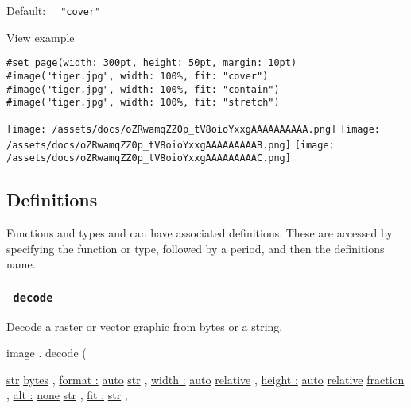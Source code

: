 Default: \texttt{\ }{\texttt{\ "cover"\ }}\texttt{\ }


View example

\begin{verbatim}
#set page(width: 300pt, height: 50pt, margin: 10pt)
#image("tiger.jpg", width: 100%, fit: "cover")
#image("tiger.jpg", width: 100%, fit: "contain")
#image("tiger.jpg", width: 100%, fit: "stretch")
\end{verbatim}

\texttt{[image: /assets/docs/oZRwamqZZ0p\_tV8oioYxxgAAAAAAAAAA.png]}
\texttt{[image: /assets/docs/oZRwamqZZ0p\_tV8oioYxxgAAAAAAAAAB.png]}
\texttt{[image: /assets/docs/oZRwamqZZ0p\_tV8oioYxxgAAAAAAAAAC.png]}

\subsection{\texorpdfstring{{ Definitions
}}{ Definitions }}\label{definitions}

\label{definitions-tooltip}
Functions and types and can have associated definitions. These are
accessed by specifying the function or type, followed by a period, and
then the definition\textquotesingle s name.

\subsubsection{\texorpdfstring{\texttt{\ decode\ }}{ decode }}\label{definitions-decode}

Decode a raster or vector graphic from bytes or a string.

image { . } { decode } (

{ \href{/docs/reference/foundations/str/}{str}
\href{/docs/reference/foundations/bytes/}{bytes} , } {
\hyperref[definitions-decode-parameters-format]{format :}
\href{/docs/reference/foundations/auto/}{auto}
\href{/docs/reference/foundations/str/}{str} , } {
\hyperref[definitions-decode-parameters-width]{width :}
\href{/docs/reference/foundations/auto/}{auto}
\href{/docs/reference/layout/relative/}{relative} , } {
\hyperref[definitions-decode-parameters-height]{height :}
\href{/docs/reference/foundations/auto/}{auto}
\href{/docs/reference/layout/relative/}{relative}
\href{/docs/reference/layout/fraction/}{fraction} , } {
\hyperref[definitions-decode-parameters-alt]{alt :}
\href{/docs/reference/foundations/none/}{none}
\href{/docs/reference/foundations/str/}{str} , } {
\hyperref[definitions-decode-parameters-fit]{fit :}
\href{/docs/reference/foundations/str/}{str} , }

